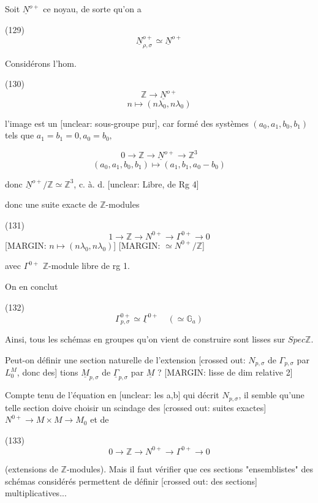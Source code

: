 Soit $\underline{N}^{o+}$ ce noyau, de sorte qu'on a

(129) $$\underline{N}_{\rho,\sigma}^{o+} \simeq \underline{N}^{o+}$$

Considérons l'hom.

(130) $$\mathbb{Z} \to \underline{N}^{o+}$$
$$n \mapsto (n\lambda_0, n\lambda_0)$$

l'image est un [unclear: sous-groupe pur], car formé des
systèmes $(a_0, a_1, b_0, b_1)$ tels que
$a_1 = b_1 = 0, a_0 = b_0,$

$$0 \to \mathbb{Z} \to \underline{N}^{o+} \to \mathbb{Z}^3$$
$$(a_0, a_1, b_0, b_1) \mapsto (a_1, b_1, a_0 - b_0)$$

donc $\underline{N}^{o+} / \mathbb{Z} \simeq \mathbb{Z}^3$, c. à. d. [unclear: Libre, de Rg 4]

\newpage


donc une suite exacte de $\mathbb{Z}$-modules

(131)
$$1 \longrightarrow \mathbb{Z} \longrightarrow N^{0+} \longrightarrow \Gamma^{0+} \longrightarrow 0$$
[MARGIN: $n \longmapsto (n\lambda_0,n\lambda_0)$]
[MARGIN: $\simeq N^{0+}/\mathbb{Z}$]

avec $\Gamma^{0+}$ $\mathbb{Z}$-module libre de rg 1.

On en conclut

(132)
$$\Gamma_{p,\sigma}^{0+} \simeq \underline{\Gamma}^{0+} \quad (\simeq \mathbb{G}_a)$$

Ainsi, tous les schémas en groupes
qu'on vient de construire sont lisses
sur $Spec \mathbb{Z}$.

Peut-on définir une section
naturelle de l'extension
[crossed out: $N_{p,\sigma}$ de $\Gamma_{p,\sigma}$ par $L_0^M$, donc des]
tions $\underline{M}_{p,\sigma}$ de $\underline{\Gamma}_{p,\sigma}$ par $\underline{M}$ ?
[MARGIN: lisse de dim relative 2]

Compte tenu de l'équation en
[unclear: les a,b] qui décrit $N_{p,\sigma}$, il semble
qu'une telle section
doive choisir un scindage des
[crossed out: suites exactes] $N^{0+} \longrightarrow M \times M \longrightarrow M_0$
et de

(133)
$$0 \longrightarrow \mathbb{Z} \longrightarrow N^{0+} \longrightarrow \Gamma^{0+} \longrightarrow 0$$

(extensions de $\mathbb{Z}$-modules). Mais il
faut vérifier que ces sections "ensemblistes"
des schémas considérés permettent de définir
[crossed out: des sections] multiplicatives...

